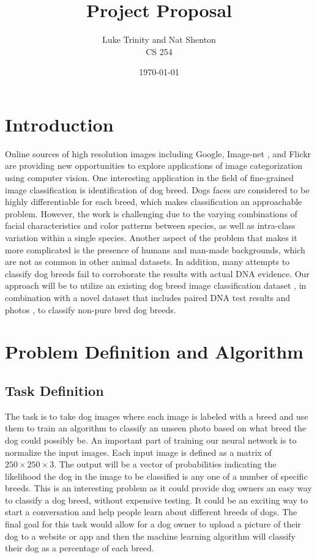 \documentclass[12pt]{article}
\title{Project Proposal}
\date{\today}
\author{Luke Trinity and Nat Shenton \\  CS 254}
\begin{document}
 
\maketitle
\section{Introduction}

Online sources of high resolution images including Google, Image-net \cite{deng2009imagenet}, and Flickr are providing new opportunities to explore applications of image categorization using computer vision. One interesting application in the field of fine-grained image classification is identification of dog breed. Dogs faces are considered to be highly differentiable for each breed, which makes classification an approachable problem.  However, the work is challenging due to the varying combinations of facial characteristics and color patterns between species, as well as intra-class variation within a single species. Another aspect of the problem that makes it more complicated is the presence of humans and man-made backgrounds, which are not as common in other animal datasets. In addition, many attempts to classify dog breeds fail to corroborate the results with actual DNA evidence. Our approach will be to utilize an existing dog breed image classification dataset \cite{khosla2011novel}, in combination with a novel dataset that includes paired DNA test results and photos \cite{voith2009comparison}, to  classify non-pure bred dog breeds. 

\section{Problem Definition and Algorithm}

\subsection{Task Definition}

The task is to take dog images where each image is labeled with a breed and use them to train an algorithm to classify an unseen photo based on what breed the dog could possibly be.  An important part of training our neural network is to normalize the input images.  Each input image is defined as a matrix of $250\times 250\times3$.  The output will be a vector of probabilities indicating the likelihood the dog in the image to be classified is any one of a number of specific breeds.  This is an interesting problem as it could provide dog owners an easy way to classify a dog breed, without expensive testing. It could be an exciting way to start a conversation and help people learn about different breeds of dogs. The final goal for this task would allow for a dog owner to upload a picture of their dog to a website or app and then the machine learning algorithm will classify their dog as a percentage of each breed. 
\end{document}
